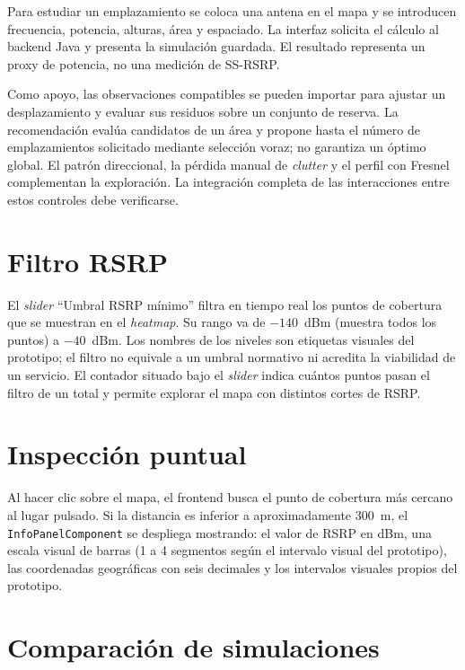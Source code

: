 Para estudiar un emplazamiento se coloca una antena en el mapa y se introducen
frecuencia, potencia, alturas, área y espaciado. La interfaz solicita el cálculo
al backend Java y presenta la simulación guardada. El resultado representa un
proxy de potencia, no una medición de SS-RSRP.

Como apoyo, las observaciones compatibles se pueden importar para ajustar un
desplazamiento y evaluar sus residuos sobre un conjunto de reserva. La recomendación
evalúa candidatos de un área y propone hasta el número de emplazamientos solicitado
mediante selección voraz;
no garantiza un óptimo global. El patrón direccional, la pérdida manual de
\textit{clutter} y el perfil con Fresnel complementan la exploración. La integración
completa de las interacciones entre estos controles debe verificarse.

\section{Filtro RSRP}
\label{sec:manual_rsrp}

El \textit{slider} ``Umbral RSRP mínimo'' filtra en tiempo real los puntos de
cobertura que se muestran en el \textit{heatmap}. Su rango va de $-140$~dBm
(muestra todos los puntos) a $-40$~dBm. Los nombres de los niveles son etiquetas
visuales del prototipo; el filtro no equivale a un umbral normativo ni acredita
la viabilidad de un servicio. El
contador situado bajo el \textit{slider} indica cuántos puntos pasan el filtro
de un total y permite explorar el mapa con distintos cortes de RSRP.

\section{Inspección puntual}
\label{sec:manual_inspeccion}

Al hacer clic sobre el mapa, el frontend busca el punto de cobertura más cercano
al lugar pulsado. Si la distancia es inferior a aproximadamente 300~m, el
\texttt{InfoPanelComponent} se despliega mostrando: el valor de RSRP en dBm, una
escala visual de barras (1 a 4 segmentos según el intervalo visual del prototipo),
las coordenadas geográficas con seis decimales y los intervalos visuales propios
del prototipo.

\section{Comparación de simulaciones}
\label{sec:manual_comparacion}

